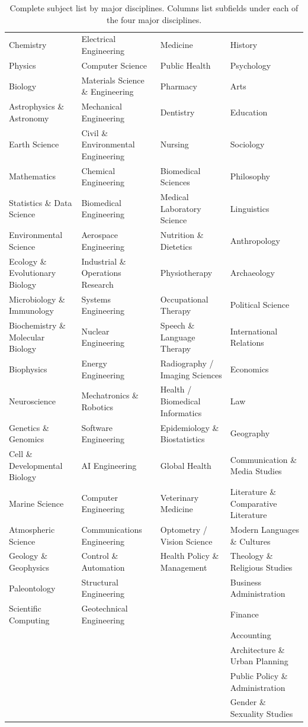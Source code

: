 \documentclass{llmxive}
\begin{document}
\begin{table}[h]
{\begin{tabular}{C{0.24\textwidth} C{0.24\textwidth} C{0.24\textwidth} C{0.24\textwidth}}
Chemistry & Electrical Engineering & Medicine & History \\
Physics & Computer Science & Public Health & Psychology \\
Biology & Materials Science \& Engineering & Pharmacy & Arts \\
Astrophysics \& Astronomy & Mechanical Engineering & Dentistry & Education \\
Earth Science & Civil \& Environmental Engineering & Nursing & Sociology \\
Mathematics & Chemical Engineering & Biomedical Sciences & Philosophy \\
Statistics \& Data Science & Biomedical Engineering & Medical Laboratory Science & Linguistics \\
Environmental Science & Aerospace Engineering & Nutrition \& Dietetics & Anthropology \\
Ecology \& Evolutionary Biology & Industrial \& Operations Research & Physiotherapy & Archaeology \\
Microbiology \& Immunology & Systems Engineering & Occupational Therapy & Political Science \\
Biochemistry \& Molecular Biology & Nuclear Engineering & Speech \& Language Therapy & International Relations \\
Biophysics & Energy Engineering & Radiography / Imaging Sciences & Economics \\
Neuroscience & Mechatronics \& Robotics & Health / Biomedical Informatics & Law \\
Genetics \& Genomics & Software Engineering & Epidemiology \& Biostatistics & Geography \\
Cell \& Developmental Biology & AI Engineering & Global Health & Communication \& Media Studies \\
Marine Science & Computer Engineering & Veterinary Medicine & Literature \& Comparative Literature \\
Atmospheric Science & Communications Engineering & Optometry / Vision Science & Modern Languages \& Cultures \\
Geology \& Geophysics & Control \& Automation & Health Policy \& Management & Theology \& Religious Studies \\
Paleontology & Structural Engineering &  & Business Administration\\
Scientific Computing & Geotechnical Engineering &  & Finance \\
 &  &  & Accounting \\
 &  &  & Architecture \& Urban Planning \\
 &  &  & Public Policy \& Administration \\
 &  &  & Gender \& Sexuality Studies \\

\bottomrule[1pt]
\end{tabular}
}
\caption{Complete subject list by major disciplines. Columns list subfields under each of the four major disciplines.}
\label{tab:complete-subject-grid}
\end{table}
\end{document}
